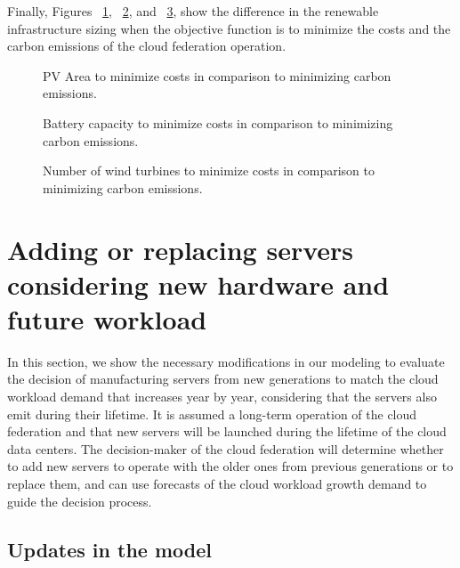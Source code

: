 Finally, Figures ~\ref{fig:pv_co2_costs},  ~\ref{fig:bat_co2_costs}, and ~\ref{fig:wt_co2_costs}, show the difference in the renewable infrastructure sizing when the objective function is to minimize the costs and the carbon emissions of the cloud federation operation.

\begin{figure}[H]
  \centering
  {}
  \caption{PV Area to minimize costs in comparison to minimizing carbon emissions. }
  \label{fig:pv_co2_costs}
\end{figure}


\begin{figure}[H]
  \centering
  {}
  \caption{Battery capacity to minimize costs in comparison to minimizing carbon emissions.  }
  \label{fig:bat_co2_costs}
\end{figure}

\begin{figure}[H]
  \centering
  {}
  \caption{Number of wind turbines  to minimize costs in comparison to minimizing carbon emissions.}
  \label{fig:wt_co2_costs}
\end{figure}


\section{Adding or replacing servers considering new hardware and future workload }
\label{sec:new_servers}

In this section, we show the necessary modifications in our modeling to evaluate the decision of manufacturing servers from new generations to match the cloud workload demand that increases year by year, considering that the servers also emit  during their lifetime. It is assumed a long-term operation of the cloud federation and that new servers will be launched during the lifetime of the cloud data centers. The decision-maker of the cloud federation will determine whether to add new servers to operate with the older ones from previous generations or to replace them, and can use forecasts of the cloud workload growth demand to guide the decision process.

\subsection{Updates in the model}



